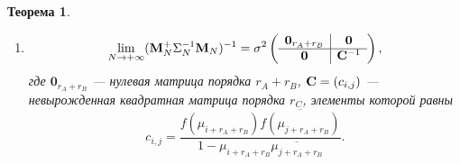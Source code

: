 \documentclass[12pt,a4paper]{article}
\newtheorem{theorem}{Теорема}
\begin{document}
\begin{theorem}
\begin{enumerate}
		\item 
		\begin{equation*}
		\lim_{N \to + \infty} (\mathbf{M}_N^+ \Sigma_N^{-1} \mathbf{M}_N)^{-1} = \sigma^2 \left( \begin{array}{c|c}
		\mathbf{0}_{r_A + r_B} & \mathbf{0} \\ \hline
		\mathbf{0} & \mathbf{C}^{-1}
		\end{array}  \right),
		\end{equation*}
		где $\mathbf{0}_{r_A + r_B}$ --- нулевая матрица порядка $r_A + r_B$, $\mathbf{C} = (c_{i,j})$ --- невырожденная квадратная матрица порядка $r_C$, элементы которой равны
		\begin{equation*}
		c_{i, j} = \frac{f(\mu_{i + r_A + r_B}) \overline{f(\mu_{j + r_A + r_B})}}{1 - \mu_{i+r_A+r_B} \overline{\mu_{j+r_A+r_B}}}.
		\end{equation*}
	\end{enumerate}
\end{theorem}
\end{document}
